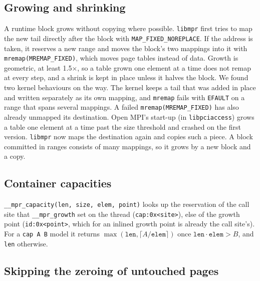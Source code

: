 \documentclass[11pt]{article}
\newcommand{\libmpr}{\texttt{libmpr}}
\begin{document}
\subsection{Growing and shrinking}

A runtime block grows without copying where possible. \libmpr{} first tries to map the new tail directly after
the block with \texttt{MAP\_FIXED\_NOREPLACE}. If the address is taken, it reserves a new range and moves the
block's two mappings into it with \texttt{mremap(MREMAP\_FIXED)}, which moves page tables instead of data.
Growth is geometric, at least 1.5$\times$, so a table grown one element at a time does not remap at every step,
and a shrink is kept in place unless it halves the block. We found two kernel behaviours on the way. The kernel
keeps a tail that was added in place and written separately as its own mapping, and \texttt{mremap} fails with
\texttt{EFAULT} on a range that spans several mappings. A failed \texttt{mremap(MREMAP\_FIXED)} has also already
unmapped its destination. Open MPI's start-up (in \texttt{libpciaccess}) grows a table one element at a time
past the size threshold and crashed on the first version. \libmpr{} now maps the destination again and copies
such a piece. A block committed in ranges consists of many mappings, so it grows by a new block and a copy.

\subsection{Container capacities}

\texttt{\_\_mpr\_capacity(len, size, elem, point)} looks up the reservation of the call site that
\texttt{\_\_mpr\_growth} set on the thread (\texttt{cap:0x<site>}), else of the growth point (\texttt{id:0x<point>}, which
for an inlined growth point is already the call site's). For a \texttt{cap A B} model it returns
$\max(\texttt{len}, \lceil A / \texttt{elem} \rceil)$ once $\texttt{len} \cdot \texttt{elem} > B$, and \texttt{len} otherwise.

\subsection{Skipping the zeroing of untouched pages}
\label{sec:runtime-zero}
\end{document}
